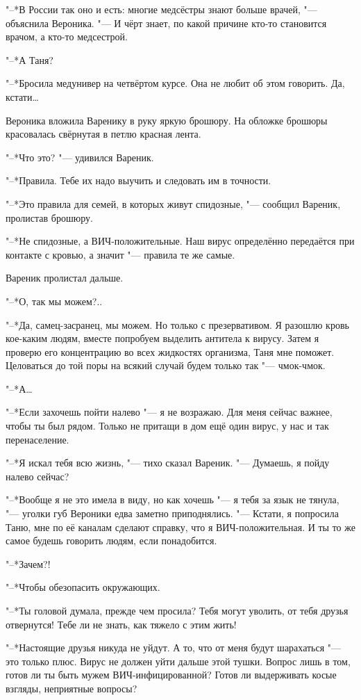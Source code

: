 "--*В России так оно и есть: многие медсёстры знают больше врачей, "--- объяснила Вероника.
"--- И чёрт знает, по какой причине кто-то становится врачом, а кто-то медсестрой.

"--*А Таня?

"--*Бросила медунивер на четвёртом курсе.
Она не любит об этом говорить.
Да, кстати\dots{}

Вероника вложила Варенику в руку яркую брошюру.
На обложке брошюры красовалась свёрнутая в петлю красная лента.

"--*Что это? "--- удивился Вареник.

"--*Правила.
Тебе их надо выучить и следовать им в точности.

"--*Это правила для семей, в которых живут спидозные, "--- сообщил Вареник, пролистав брошюру.

"--*Не спидозные, а ВИЧ-положительные.
Наш вирус определённо передаётся при контакте с кровью, а значит "--- правила те же самые.

Вареник пролистал дальше.

"--*О, так мы можем?..

"--*Да, самец-засранец, мы можем.
Но только с презервативом.
Я разошлю кровь кое-каким людям, вместе попробуем выделить антитела к вирусу.
Затем я проверю его концентрацию во всех жидкостях организма, Таня мне поможет.
Целоваться до той поры на всякий случай будем только так "--- чмок-чмок.

"--*А\dots{}

"--*Если захочешь пойти налево "--- я не возражаю.
Для меня сейчас важнее, чтобы ты был рядом.
Только не притащи в дом ещё один вирус, у нас и так перенаселение.

"--*Я искал тебя всю жизнь, "--- тихо сказал Вареник.
"--- Думаешь, я пойду налево сейчас?

"--*Вообще я не это имела в виду, но как хочешь "--- я тебя за язык не тянула, "--- уголки губ Вероники едва заметно приподнялись.
"--- Кстати, я попросила Таню, мне по её каналам сделают справку, что я ВИЧ-положительная.
И ты то же самое будешь говорить людям, если понадобится.

"--*Зачем?!

"--*Чтобы обезопасить окружающих.

"--*Ты головой думала, прежде чем просила?
Тебя могут уволить, от тебя друзья отвернутся!
Тебе ли не знать, как тяжело с этим жить!

"--*Настоящие друзья никуда не уйдут.
А то, что от меня будут шарахаться "--- это только плюс.
Вирус не должен уйти дальше этой тушки.
Вопрос лишь в том, готов ли ты быть мужем ВИЧ-инфицированной?
Готов ли выдерживать косые взгляды, неприятные вопросы?

